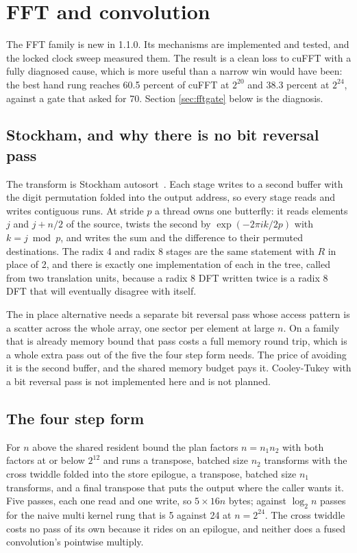 \section{FFT and convolution}
\label{sec:fft}

The FFT family is new in 1.1.0. Its mechanisms are implemented and tested, and the
locked clock sweep measured them. The result is a clean loss to cuFFT with a fully
diagnosed cause, which is more useful than a narrow win would have been: the best
hand rung reaches 60.5 percent of cuFFT at $2^{20}$ and 38.3 percent at $2^{24}$,
against a gate that asked for 70. Section \ref{sec:fftgate} below is the
diagnosis.

\subsection{Stockham, and why there is no bit reversal pass}

The transform is Stockham autosort~\cite{vanloan1992}. Each stage writes to a
second buffer with the digit permutation folded into the output address, so every
stage reads and writes contiguous runs. At stride $p$ a thread owns one butterfly:
it reads elements $j$ and $j + n/2$ of the source, twists the second by
$\exp(-2\pi i k / 2p)$ with $k = j \bmod p$, and writes the sum and the difference
to their permuted destinations. The radix 4 and radix 8 stages are the same
statement with $R$ in place of 2, and there is exactly one implementation of each
in the tree, called from two translation units, because a radix 8 DFT written
twice is a radix 8 DFT that will eventually disagree with itself.

The in place alternative needs a separate bit reversal pass whose access pattern is
a scatter across the whole array, one sector per element at large $n$. On a family
that is already memory bound that pass costs a full memory round trip, which is a
whole extra pass out of the five the four step form needs. The price of avoiding it
is the second buffer, and the shared memory budget pays it. Cooley-Tukey with a bit
reversal pass is not implemented here and is not planned.

\subsection{The four step form}

For $n$ above the shared resident bound the plan factors $n = n_1 n_2$ with both
factors at or below $2^{12}$ and runs a transpose, batched size $n_2$ transforms
with the cross twiddle folded into the store epilogue, a transpose, batched size
$n_1$ transforms, and a final transpose that puts the output where the caller wants
it. Five passes, each one read and one write, so $5 \times 16n$ bytes; against
$\log_2 n$ passes for the naive multi kernel rung that is 5 against 24 at
$n = 2^{24}$. The cross twiddle costs no pass of its own because it rides on an
epilogue, and neither does a fused convolution's pointwise multiply.

